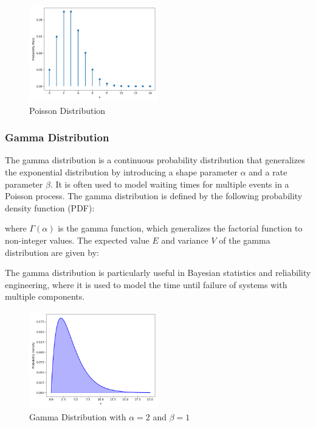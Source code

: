 \begin{figure}[h]
    \centering
    \includegraphics[width=0.5\textwidth]{../images/plot_poisson_distribution.png}
    \caption{Poisson Distribution}
    \label{fig:poisson_distribution}
\end{figure}

\subsubsection{Gamma Distribution}\label{Gamma Distribution}
The gamma distribution is a continuous probability distribution that generalizes the exponential distribution by introducing a shape parameter $\alpha$ and a rate parameter $\beta$. It is often used to model waiting times for multiple events in a Poisson process. The gamma distribution is defined by the following probability density function (PDF):

where $\Gamma(\alpha)$ is the gamma function, which generalizes the factorial function to non-integer values. The expected value $E$ and variance $V$ of the gamma distribution are given by:


The gamma distribution is particularly useful in Bayesian statistics and reliability engineering, where it is used to model the time until failure of systems with multiple components.

\begin{figure}[h]
    \centering
    \includegraphics[width=0.5\textwidth]{../images/plot_gamma_distribution.png}
    \caption{Gamma Distribution with $\alpha=2$ and $\beta=1$}
    \label{fig:gamma_distribution}
\end{figure}

